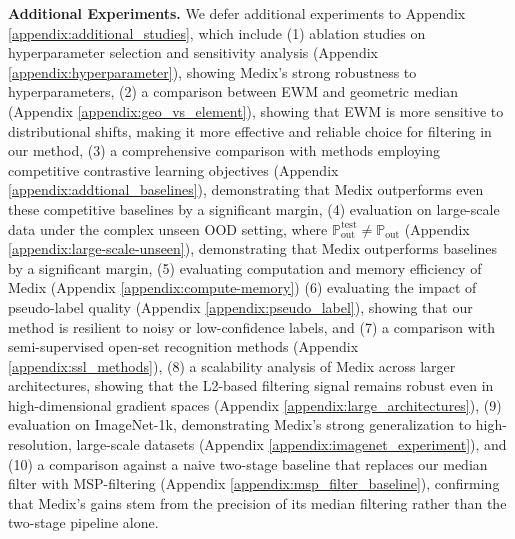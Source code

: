 \documentclass[10pt]{article} %
\theoremstyle{plain}
\theoremstyle{definition}
\begin{document}
\textbf{Additional Experiments.} 
We defer additional experiments to Appendix \ref{appendix:additional_studies}, which include (1) ablation studies on hyperparameter selection and sensitivity analysis (Appendix \ref{appendix:hyperparameter}), showing Medix's strong robustness to hyperparameters, (2) a comparison between EWM and geometric median (Appendix \ref{appendix:geo_vs_element}), showing that EWM is more sensitive to distributional shifts, making it more effective and reliable choice for filtering in our method, (3) a comprehensive comparison with methods employing competitive contrastive learning objectives (Appendix \ref{appendix:addtional_baselines}), demonstrating that
Medix outperforms even these competitive baselines by a significant margin, (4) evaluation on large-scale data under the complex unseen OOD setting, where \( \mathbb{P}_{\text{out}}^{\text{test}} \neq \mathbb{P}_{\text{out}} \) (Appendix \ref{appendix:large-scale-unseen}), demonstrating that
Medix outperforms baselines by a significant margin, (5) evaluating computation and memory efficiency of Medix (Appendix \ref{appendix:compute-memory}) (6) evaluating the impact of pseudo-label quality (Appendix \ref{appendix:pseudo_label}), showing that our method is resilient to noisy or low-confidence labels, and
(7) a comparison with semi-supervised open-set recognition methods (Appendix \ref{appendix:ssl_methods}), (8) a scalability analysis of Medix across larger architectures, showing that the L2-based filtering signal remains robust even in high-dimensional gradient spaces (Appendix \ref{appendix:large_architectures}), (9) evaluation on ImageNet-1k, demonstrating Medix’s strong generalization to high-resolution, large-scale datasets (Appendix \ref{appendix:imagenet_experiment}), and (10) a comparison against a naive two-stage baseline that replaces our median filter with MSP-filtering (Appendix \ref{appendix:msp_filter_baseline}), confirming that Medix's gains stem from the precision of its median filtering rather than the two-stage pipeline alone.
\end{document}
